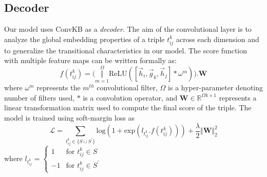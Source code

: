 \documentclass[11pt,a4paper]{article}
\begin{document}
\subsection{Decoder}
Our model uses ConvKB \cite{nguyen2018novel} as a \emph{decoder}. 
The aim of the convolutional layer is to analyze the global embedding properties of a triple $t_{ij}^{k}$ across each dimension and to generalize the transitional characteristics in our model. 
The score function with multiple feature maps can be written formally as:
\begin{equation*}\label{eq:sumhiprime}
 f(t_{ij}^{k}) = \Bigg (\underset{m=1}{\stackrel{\Omega}{\Big \Vert}}  \textrm{ReLU}([\vec{h}_i, \vec{g}_k, \vec{h}_j]*\omega^m)\Bigg).\textbf{W}
\end{equation*}
where \(\omega^m\) represents the \(m^{th}\) convolutional filter, \(\Omega\) is a hyper-parameter denoting number of filters used, $*$ is a convolution operator, and \(\textbf{W} \in \mathbb{R}^{\Omega k \times 1}\) represents a linear transformation matrix used to compute the final score of the triple. 
The model is trained using soft-margin loss as 
\begin{equation*}\label{eq:soft-margin}
 \mathcal{L} = \sum_{t_{ij}^{k} \in \{S \cup S^{\prime}\}} \textrm{log} (1 + \textrm{exp} (l_{t_{ij}^{k}}. f(t_{ij}^{k})) ) + \frac{\lambda}{2} \Vert \textbf{W} \Vert_{2}^{2}
\end{equation*}
where $l_{t_{ij}^{k}} = \begin{cases}
1 &\text{for $t_{ij}^{k} \in S$}\\
-1 &\text{for $t_{ij}^{k} \in S^{\prime}$}
\end{cases}$
\end{document}
